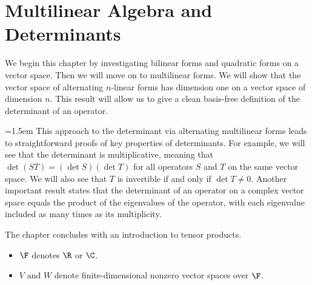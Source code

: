 \chapter{Multilinear Algebra and Determinants}

We begin this chapter by investigating bilinear forms and quadratic forms on a
vector space. Then we will move on to multilinear forms. We will show that the
vector space of alternating $n$-linear forms has dimension one on a vector space
of dimension $n$. This result will allow us to give a clean basis-free
definition of the determinant of an operator.

{\emergencystretch=1.5em
This approach to the determinant via alternating multilinear forms leads to
straightforward proofs of key properties of determinants. For example, we will
see that the determinant is multiplicative, meaning that
$\det(ST)=(\det S)(\det T)$ for all operators $S$ and $T$ on the same vector
space. We will also see that $T$ is invertible if and only if $\det T\ne0$.
Another important result states that the determinant of an operator on a
complex vector space equals the product of the eigenvalues of the operator,
with each eigenvalue included as many times as its multiplicity.\par}

The chapter concludes with an introduction to tensor products.

\begin{definition*}\leavevmode
\begin{itemize}
\item $\F$ denotes $\R$ or $\C$.
\item $V$ and $W$ denote finite-dimensional nonzero vector spaces over $\F$.
\end{itemize}
\end{definition*}
